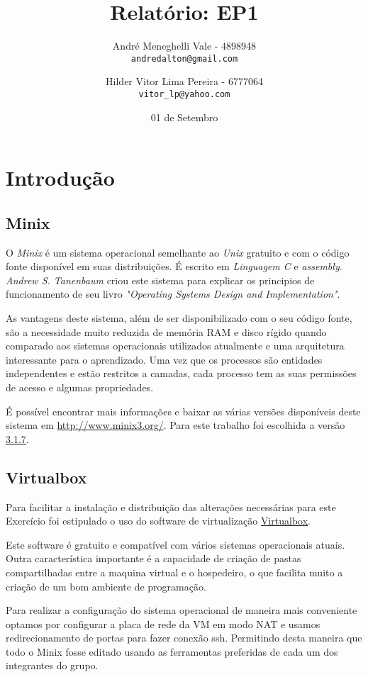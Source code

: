 \documentclass[12pt,a4paper]{article}
\author{
    André Meneghelli Vale - 4898948\\
    \texttt{andredalton@gmail.com}
    \and
    Hilder Vitor Lima Pereira - 6777064\\
    \texttt{vitor\_lp@yahoo.com}
}
\date{01 de Setembro} %
\title{Relatório: EP1}
\begin{document}
\maketitle

\section{Introdução}

\subsection{Minix}

   O \emph{Minix} é um sistema operacional semelhante ao \emph{Unix} gratuito e com o código fonte disponível em suas distribuições. É escrito em \emph{Linguagem C} e \emph{assembly}. \emph{Andrew S. Tanenbaum} criou este sistema para explicar os principios de funcionamento de seu livro \emph{"Operating Systems Design and Implementation"}.

   As vantagens deste sistema, além de ser disponibilizado com o seu código fonte, são a necessidade muito reduzida de memória RAM e disco rígido quando comparado aos sistemas operacionais utilizados atualmente e uma arquitetura interessante para o aprendizado. Uma vez que os processos são entidades independentes e estão restritos a camadas, cada processo tem as suas permissões de acesso e algumas propriedades.

   É possível encontrar mais informações e baixar as várias versões disponíveis deste sistema em \url{http://www.minix3.org/}. Para este trabalho foi escolhida a versão \href{http://www.minix3.org/iso/minix_R3.1.7-r7256.iso.gz}{3.1.7}.

\subsection{Virtualbox}

   Para facilitar a instalação e distribuição das alterações necessárias para este Exercício foi estipulado o uso do software de virtualização \href{https://www.virtualbox.org/}{Virtualbox}.

   Este software é gratuito e compatível com vários sistemas operacionais atuais. Outra característica importante é a capacidade de criação de pastas compartilhadas entre a maquina virtual e o hospedeiro, o que facilita muito a criação de um bom ambiente de programação.
   
   Para realizar a configuração do sistema operacional de maneira mais conveniente optamos por configurar a placa de rede da VM em modo NAT e usamos redirecionamento de portas para fazer conexão ssh. Permitindo desta maneira que todo o Minix fosse editado usando as ferramentas preferidas de cada um dos integrantes do grupo.
\end{document}
